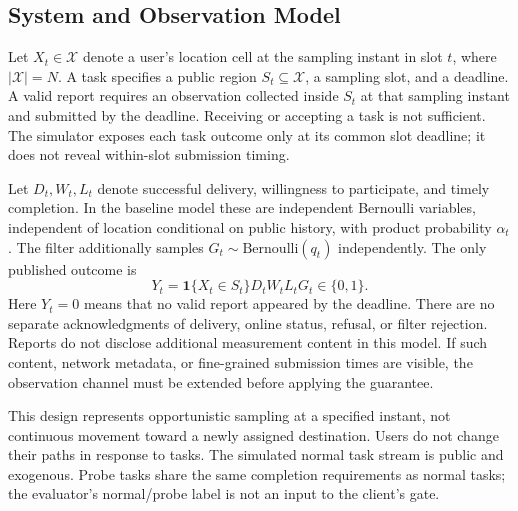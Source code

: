 \documentclass[10pt,journal,compsoc]{IEEEtran}
\newcommand{\ind}{\mathbf{1}}
\begin{document}
\subsection{System and Observation Model}
Let $X_t\in\mathcal X$ denote a user's location cell at the sampling instant in slot $t$, where $|\mathcal X|=N$. A task specifies a public region $S_t\subseteq\mathcal X$, a sampling slot, and a deadline. A valid report requires an observation collected inside $S_t$ at that sampling instant and submitted by the deadline. Receiving or accepting a task is not sufficient. The simulator exposes each task outcome only at its common slot deadline; it does not reveal within-slot submission timing.

Let $D_t,W_t,L_t$ denote successful delivery, willingness to participate, and timely completion. In the baseline model these are independent Bernoulli variables, independent of location conditional on public history, with product probability $\alpha_t$. The filter additionally samples $G_t\sim\mathrm{Bernoulli}(q_t)$ independently. The only published outcome is
\begin{equation}
 Y_t=\ind\{X_t\in S_t\}D_tW_tL_tG_t\in\{0,1\}.
 \label{eq:output}
\end{equation}
Here $Y_t=0$ means that no valid report appeared by the deadline. There are no separate acknowledgments of delivery, online status, refusal, or filter rejection. Reports do not disclose additional measurement content in this model. If such content, network metadata, or fine-grained submission times are visible, the observation channel must be extended before applying the guarantee.

This design represents opportunistic sampling at a specified instant, not continuous movement toward a newly assigned destination. Users do not change their paths in response to tasks. The simulated normal task stream is public and exogenous. Probe tasks share the same completion requirements as normal tasks; the evaluator's normal/probe label is not an input to the client's gate.
\end{document}
